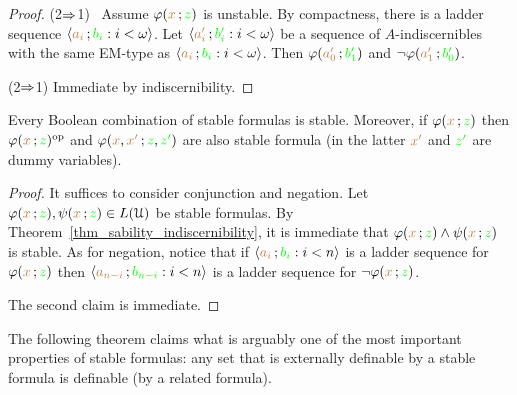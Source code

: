 \documentclass[creche.tex]{subfiles}
\begin{document}
\begin{proof}
  (2$\Rightarrow$1) \ Assume $\varphi({\color{brown} x}\,;{\color{green} z})$ is unstable.
  By compactness, there is a ladder sequence $\langle{\color{brown}a_i}\,;{\color{green} b_i} : i<\omega\rangle$.
  Let $\langle{\color{brown}a'_i}\,;{\color{green} b'_i} : i<\omega\rangle$ be a sequence of $A$-indiscernibles with the same EM-type as $\langle{\color{brown}a_i}\,;{\color{green} b_i} : i<\omega\rangle$.
  Then $\varphi({\color{brown} a'_0}\,;{\color{green} b'_1})$ and $\neg\varphi({\color{brown} a'_1}\,;{\color{green} b'_0})$.

  (2$\Rightarrow$1) Immediate by indiscernibility.
\end{proof}


\begin{lemma}\label{lem_stab_Boole}
  Every Boolean combination of stable formulas is stable.
  Moreover, if $\varphi({\color{brown} x}\,;{\color{green} z})$ then  $\varphi({\color{brown} x}\,;{\color{green} z})^{\rm op}$ and $\varphi({\color{brown} x},{\color{brown} x'}\,;{\color{green} z},{\color{green} z'})$ are also stable formula (in the latter ${\color{brown} x'}$ and ${\color{green} z'}$ are dummy variables).
\end{lemma}

\begin{proof}
  It suffices to consider conjunction and negation.
  Let $\varphi({\color{brown} x}\,;{\color{green} z}),\psi({\color{brown} x}\,;{\color{green} z})\in L(\EuScript U)$ be stable formulas.
  By Theorem~\ref{thm_sability_indiscernibility}, it is immediate that $\varphi({\color{brown} x}\,;{\color{green} z})\wedge\psi({\color{brown} x}\,;{\color{green} z})$ is stable.
  As for negation, notice that if $\langle{\color{brown}a_i}\,;{\color{green} b_i} : i<n\rangle$ is a ladder sequence for $\varphi({\color{brown} x}\,;{\color{green} z})$ then  $\langle{\color{brown}a_{n-i}}\,;{\color{green} b_{n-i}} : i<n\rangle$ is a ladder sequence for $\neg\varphi({\color{brown} x}\,;{\color{green} z})$.

  The second claim is immediate.
\end{proof}

The following theorem claims what is arguably one of the most important properties of stable formulas: any set that is externally definable by a stable formula is definable (by a related formula).
\end{document}
